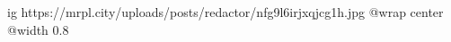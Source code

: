  
 
 
 
 

\ifcmt
  ig https://mrpl.city/uploads/posts/redactor/nfg9l6irjxqjcg1h.jpg
  @wrap center
  @width 0.8
\fi
